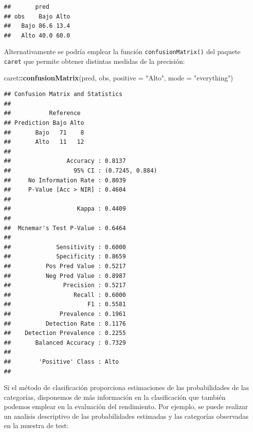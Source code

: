 \documentclass[]{book}
\newenvironment{Shaded}{\begin{snugshade}}{\end{snugshade}}
\newcommand{\KeywordTok}[1]{\textcolor[rgb]{0.13,0.29,0.53}{\textbf{#1}}}
\newcommand{\DataTypeTok}[1]{\textcolor[rgb]{0.13,0.29,0.53}{#1}}
\newcommand{\StringTok}[1]{\textcolor[rgb]{0.31,0.60,0.02}{#1}}
\newcommand{\OperatorTok}[1]{\textcolor[rgb]{0.81,0.36,0.00}{\textbf{#1}}}
\newcommand{\NormalTok}[1]{#1}
\theoremstyle{break}
\theoremstyle{definition}
\theoremstyle{definition}
\theoremstyle{definition}
\theoremstyle{remark}
\begin{document}
\begin{verbatim}
##       pred
## obs    Bajo Alto
##   Bajo 86.6 13.4
##   Alto 40.0 60.0
\end{verbatim}

Alternativamente se podría emplear la función \texttt{confusionMatrix()}
del paquete \texttt{caret} que permite obtener distintas medidas de la
precisión:

\begin{Shaded}
\begin{Highlighting}[]
\NormalTok{caret}\OperatorTok{::}\KeywordTok{confusionMatrix}\NormalTok{(pred, obs, }\DataTypeTok{positive =} \StringTok{"Alto"}\NormalTok{, }\DataTypeTok{mode =} \StringTok{"everything"}\NormalTok{)}
\end{Highlighting}
\end{Shaded}

\begin{verbatim}
## Confusion Matrix and Statistics
## 
##           Reference
## Prediction Bajo Alto
##       Bajo   71    8
##       Alto   11   12
##                                          
##                Accuracy : 0.8137         
##                  95% CI : (0.7245, 0.884)
##     No Information Rate : 0.8039         
##     P-Value [Acc > NIR] : 0.4604         
##                                          
##                   Kappa : 0.4409         
##                                          
##  Mcnemar's Test P-Value : 0.6464         
##                                          
##             Sensitivity : 0.6000         
##             Specificity : 0.8659         
##          Pos Pred Value : 0.5217         
##          Neg Pred Value : 0.8987         
##               Precision : 0.5217         
##                  Recall : 0.6000         
##                      F1 : 0.5581         
##              Prevalence : 0.1961         
##          Detection Rate : 0.1176         
##    Detection Prevalence : 0.2255         
##       Balanced Accuracy : 0.7329         
##                                          
##        'Positive' Class : Alto           
## 
\end{verbatim}

Si el método de clasificación proporciona estimaciones de las
probabilidades de las categorías, disponemos de más información en la
clasificación que también podemos emplear en la evaluación del
rendimiento. Por ejemplo, se puede realizar un analisis descriptivo de
las probabilidades estimadas y las categorías observadas en la muestra
de test:
\end{document}

